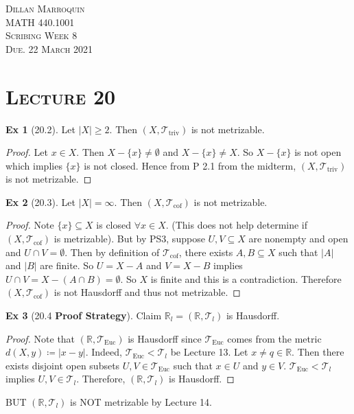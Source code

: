 \documentclass{article}
\newcommand{\R}{\ensuremath{\mathbb{R}}}
\newcommand{\es}{\ensuremath{\emptyset}}
\newcommand{\coleq}{\ensuremath{\coloneqq}}
\newcommand{\tp}{\ensuremath{\mathcal{T}}}
\newcommand{\Ts}[2]{\ensuremath{(#1,#2)}}
\newcommand{\tpcof}{\ensuremath{\tp_\text{cof}}}
\newcommand{\tptriv}{\ensuremath{\tp_\text{triv}}}
\newcommand{\tpeuc}{\ensuremath{\tp_\text{Euc}}}
\newcommand{\inter}{\cap}
\renewcommand{\Subset}{\subseteq}
\theoremstyle{definition}
\newtheorem*{ex}{Ex}
\theoremstyle{remark}
\begin{document}
    \begin{center}
        \textsc{Dillan Marroquin\\MATH 440.1001\\Scribing Week 8\\Due. 22 March 2021\\}
    \end{center}
        
    \noindent\section*{\textbf{\textsc{Lecture 20}}}{
        \begin{ex}[20.2]
            Let $|X|\geq2$. Then $\Ts{X}{\tptriv}$ is not metrizable.
            \begin{proof}
                Let $x\in X$. Then $X-\{x\}\neq \es$ and $X-\{x\}\neq X$. So $X-\{x\}$ is not open which implies $\{x\}$ is not closed. Hence from P 2.1 from the midterm, $\Ts{X}{\tptriv}$ is not metrizable.
            \end{proof}
        \end{ex}
        
        \begin{ex}[20.3]
            Let $|X|=\infty$. Then $\Ts{X}{\tpcof}$ is not metrizable.
            \begin{proof}
                Note $\{x\} \Subset X$ is closed $\forall x \in X$. (This does not help determine if $\Ts{X}{\tpcof}$ is metrizable). But by PS3, suppose $U,V \Subset X$ are nonempty and open and $U \inter V=\es$. Then by definition of $\tpcof$, there exists $A,B \Subset X$ such that $|A|$ and $|B|$ are finite. So $U=X-A$ and $V=X-B$ implies $U\inter V=X-(A\inter B)=\es$. So $X$ is finite and this is a contradiction. Therefore $\Ts{X}{\tpcof}$ is not Hausdorff and thus not metrizable.
            \end{proof}
        \end{ex}
        
        \begin{ex}[20.4 \textbf{Proof Strategy}]
            Claim $\R_l=\Ts{\R}{\tp_l}$ is Hausdorff.
            \begin{proof}
                Note that $\Ts{\R}{\tpeuc}$ is Hausdorff since $\tpeuc$ comes from the metric $d(X,y)\coleq|x-y|$. Indeed, $\tpeuc<\tp_l$ be Lecture 13. Let $x\neq q \in \R$. Then there exists disjoint open subsets $U,V \in \tpeuc$ such that $x\in U$ and $y\in V$. $\tpeuc<\tp_l$ implies $U,V\in \tp_l$. Therefore, $\Ts{\R}{\tp_l}$ is Hausdorff.
            \end{proof}
            BUT $\Ts{\R}{\tp_l}$ is NOT metrizable by Lecture 14.
        \end{ex}
        
}
\end{document}
